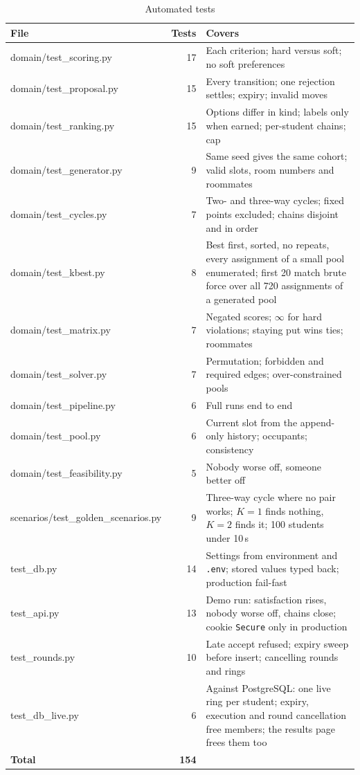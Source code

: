\begin{table}[H]
\centering
\small
\begin{tabularx}{\textwidth}{>{\ttfamily\raggedright\arraybackslash}p{} r L}
\toprule
\textrm{\textbf{File}} & \textbf{Tests} & \textbf{Covers} \\
\midrule
domain/test\_scoring.py & 17 & Each criterion; hard versus soft; no soft preferences \\
domain/test\_proposal.py & 15 & Every transition; one rejection settles; expiry; invalid moves \\
domain/test\_ranking.py & 15 & Options differ in kind; labels only when earned; per-student chains; cap \\
domain/test\_generator.py & 9 & Same seed gives the same cohort; valid slots, room numbers and roommates \\
domain/test\_cycles.py & 7 & Two- and three-way cycles; fixed points excluded; chains disjoint and in order \\
domain/test\_kbest.py & 8 & Best first, sorted, no repeats, every assignment of a small pool enumerated; first 20 match brute force over all 720 assignments of a generated pool \\
domain/test\_matrix.py & 7 & Negated scores; $\infty$ for hard violations; staying put wins ties; roommates \\
domain/test\_solver.py & 7 & Permutation; forbidden and required edges; over-constrained pools \\
domain/test\_pipeline.py & 6 & Full runs end to end \\
domain/test\_pool.py & 6 & Current slot from the append-only history; occupants; consistency \\
domain/test\_feasibility.py & 5 & Nobody worse off, someone better off \\
scenarios/test\_golden\_scenarios.py & 9 & Three-way cycle where no pair works; $K{=}1$ finds nothing, $K{=}2$ finds it; 100 students under 10\,s \\
test\_db.py & 14 & Settings from environment and \texttt{.env}; stored values typed back; production fail-fast \\
test\_api.py & 13 & Demo run: satisfaction rises, nobody worse off, chains close; cookie \texttt{Secure} only in production \\
test\_rounds.py & 10 & Late accept refused; expiry sweep before insert; cancelling rounds and rings \\
test\_db\_live.py & 6 & Against PostgreSQL: one live ring per student; expiry, execution and round cancellation free members; the results page frees them too \\
\midrule
\textbf{Total} & \textbf{154} & \\
\bottomrule
\end{tabularx}
\caption{Automated tests}
\label{tab:tests}
\end{table}

